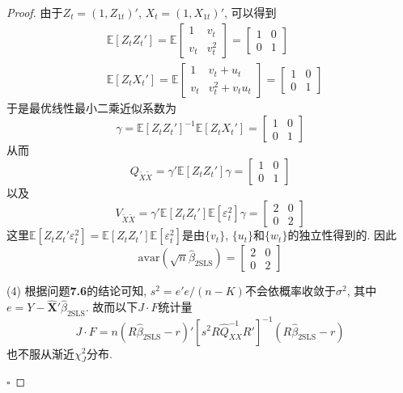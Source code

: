 \documentclass[cn,12pt,math=mtpro2,citestyle=gb7714-2015,bibstyle=gb7714-2015,twocol,mode=simple]{elegantbook}
\newcommand{\E}{\mathbb{E}}
\newcommand{\btls}{\hat{\beta}_{\text{2SLS}}}
\newcommand{\X}{\mathbf{X}}
\begin{document}
\begin{proof}
  由于$Z_t=(1,Z_{1t})'$, $X_t=(1,X_{1t})'$, 可以得到
  \begin{align*}
  &\E[Z_tZ_t']=\E\begin{bmatrix}
                   1 & v_t \\
                   v_t & v_t^2
                 \end{bmatrix}=\begin{bmatrix}
                                 1 & 0 \\
                                 0 & 1
                               \end{bmatrix}\\
  &\E[Z_tX_t']=\E\begin{bmatrix}
                   1 & v_t+u_t \\
                   v_t & v_t^2+v_tu_t
                 \end{bmatrix}=\begin{bmatrix}
                                 1 & 0 \\
                                 0 & 1
                               \end{bmatrix}
  \end{align*}
  于是最优线性最小二乘近似系数为
  $$\gamma=\E[Z_tZ_t']^{-1}\E[Z_tX_t']=\begin{bmatrix}
                                         1 & 0 \\
                                         0 & 1
                                       \end{bmatrix}$$
  从而
  $$Q_{\tilde{X}\tilde{X}}=\gamma'\E[Z_tZ_t']\gamma=\begin{bmatrix}
                                                      1 & 0 \\
                                                      0 & 1
                                                    \end{bmatrix}$$
  以及
  $$V_{\tilde{X}\tilde{X}}=\gamma'\E[Z_tZ_t']\E[\varepsilon_t^2]\gamma=\begin{bmatrix}
                                                                         2 & 0 \\
                                                                         0 & 2
                                                                       \end{bmatrix}$$
  这里$\E[Z_tZ_t'\varepsilon_t^2]=\E[Z_tZ_t']\E[\varepsilon_t^2]$是由$\{v_t\}$, $\{u_t\}$和$\{w_t\}$的独立性得到的. 因此
  $$\text{avar}(\sqrt{n}\btls)=\begin{bmatrix}
                                 2 & 0 \\
                                 0 & 2
                               \end{bmatrix}$$

  (4) 根据问题\textbf{7.6}的结论可知, $s^2=e'e/(n-K)$不会依概率收敛于$\sigma^2$, 其中$e=Y-\hat{\X}'\btls$. 故而以下$J\cdot F$统计量
  $$J\cdot F=n(R\btls-r)'[s^2R\hat{Q}_{XX}^{-1}R']^{-1}(R\btls-r)$$
  也不服从渐近$\chi_J^2$分布.

$\square$


\end{proof}
\end{document}
